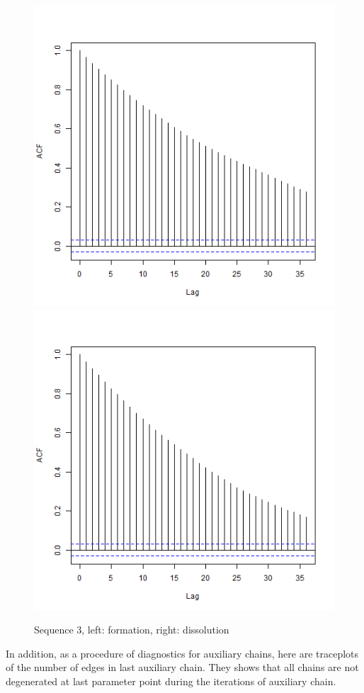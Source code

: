 \documentclass[aspectratio=169,ignorenonframetext,9pt]{beamer}
\theoremstyle{plain}
\theoremstyle{definition}
\begin{document}
\begin{figure}[h]
\begin{center}
        \includegraphics[scale=0.23]{pictures/net3seq_chain1_BSTERGM_formation_acf.png}
        \includegraphics[scale=0.23]{pictures/net3seq_chain1_BSTERGM_dissolution_acf.png}
    \caption{Sequence 3, left: formation, right: dissolution}
    \end{center}
\end{figure}
\clearpage
In addition, as a procedure of diagnostics for auxiliary chains,
here are traceplots of the number of edges in last auxiliary chain.
They shows that all chains are not degenerated at last parameter point during the iterations of auxiliary chain.
\end{document}
